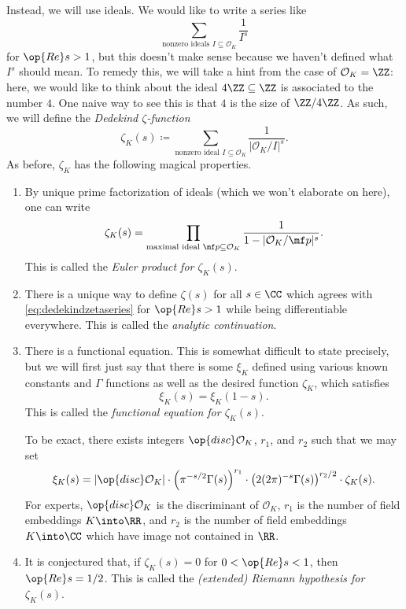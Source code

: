 \documentclass{article}
\begin{document}
Instead, we will use ideals. We would like to write a series like
\[\sum_{\text{nonzero ideals }I\subseteq\mathcal O_K}\frac1{I^s}\]
for $\op{Re}s>1$, but this doesn't make sense because we haven't defined what $I^s$ should mean. To remedy this, we will take a hint from the case of $\mathcal O_K=\ZZ$: here, we would like to think about the ideal $4\ZZ\subseteq\ZZ$ is associated to the number $4$. One naive way to see this is that $4$ is the size of $\ZZ/4\ZZ$. As such, we will define the \textit{Dedekind $\zeta$-function}
\begin{equation}
	\zeta_K(s)\coloneqq\sum_{\text{nonzero ideal }I\subseteq\mathcal O_K}\frac1{|\mathcal O_K/I|^s}. \label{eq:dedekindzetaseries}
\end{equation}
As before, $\zeta_K$ has the following magical properties.
\begin{enumerate}
	\item By unique prime factorization of ideals (which we won't elaborate on here), one can write
	\[\zeta_K(s)=\prod_{\text{maximal ideal }\mf p\subseteq\mathcal O_K}\frac1{1-|\mathcal O_K/\mf p|^s}.\]
	This is called the \textit{Euler product for $\zeta_K(s)$}.
	\item There is a unique way to define $\zeta(s)$ for all $s\in\CC$ which agrees with \autoref{eq:dedekindzetaseries} for $\op{Re}s>1$ while being differentiable everywhere. This is called the \textit{analytic continuation}.
	\item There is a functional equation. This is somewhat difficult to state precisely, but we will first just say that there is some $\xi_K$ defined using various known constants and $\Gamma$ functions as well as the desired function $\zeta_K$, which satisfies
	\[\xi_K(s)=\xi_K(1-s).\]
	This is called the \textit{functional equation for $\zeta_K(s)$}.
	
	To be exact, there exists integers $\op{disc}\mathcal O_K$, $r_1$, and $r_2$ such that we may set
	\[\xi_K(s)=|\op{disc}\mathcal O_K|\cdot\left(\pi^{-s/2}\Gamma(s)\right)^{r_1}\cdot\left(2(2\pi)^{-s}\Gamma(s)\right)^{r_2/2}\cdot\zeta_K(s).\]
	For experts, $\op{disc}\mathcal O_K$ is the discriminant of $\mathcal O_K$, $r_1$ is the number of field embeddings $K\into\RR$, and $r_2$ is the number of field embeddings $K\into\CC$ which have image not contained in $\RR$.
	\item It is conjectured that, if $\zeta_K(s)=0$ for $0<\op{Re}s<1$, then $\op{Re}s=1/2$. This is called the \textit{(extended) Riemann hypothesis for $\zeta_K(s)$}.
\end{enumerate}
\end{document}
